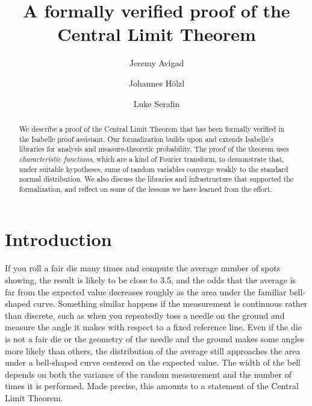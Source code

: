 \documentclass{svjour3}
\begin{document}
\title{A formally verified proof of the Central Limit Theorem}


\author{Jeremy Avigad \and Johannes H\"olzl \and Luke Serafin}


\maketitle

\begin{abstract}
We describe a proof of the Central Limit Theorem that has been formally verified in the Isabelle proof assistant. Our formalization builds upon and extends Isabelle's libraries for analysis and measure-theoretic probability. The proof of the theorem uses \emph{characteristic functions}, which are a kind of Fourier transform, to demonstrate that, under suitable hypotheses, sums of random variables converge weakly to the standard normal distribution. We also discuss the libraries and infrastructure that supported the formalization, and reflect on some of the lessons we have learned from the effort.
\end{abstract}


\section{Introduction}
\label{section:introduction}

If you roll a fair die many times and compute the average number of spots showing, the result is likely to be close to 3.5, and the odds that the average is far from the expected value decreases roughly as the area under the familiar bell-shaped curve. Something similar happens if the measurement is continuous rather than discrete, such as when you repeatedly toss a needle on the ground and measure the angle it makes with respect to a fixed reference line. Even if the die is not a fair die or the geometry of the needle and the ground makes some angles more likely than others, the distribution of the average still approaches the area under a bell-shaped curve centered on the expected value. The width of the bell depends on both the variance of the random measurement and the number of times it is performed. Made precise, this amounts to a statement of the Central Limit Theorem.
\end{document}
